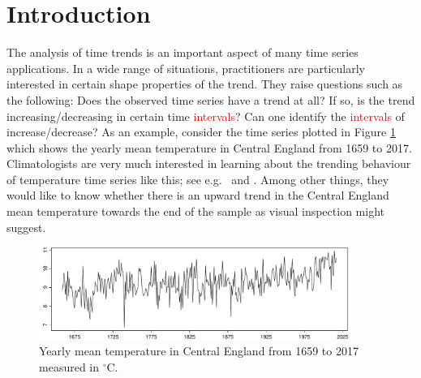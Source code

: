 
\section{Introduction}\label{sec-intro}


The analysis of time trends is an important aspect of many time series applications. In a wide range of situations, practitioners are particularly interested in certain shape properties of the trend. They raise questions such as the following: Does the observed time series have a trend at all? If so, is the trend increasing/decreasing in certain time \textcolor{red}{intervals}? Can one identify the \textcolor{red}{intervals} of increase/decrease? As an example, consider the time series plotted in Figure \ref{temp_data} which shows the yearly mean temperature in Central England from 1659 to 2017. Climatologists are very much interested in learning about the trending behaviour of temperature time series like this; see e.g.\ \cite{Benner1999} and \cite{Rahmstorf2017}. Among other things, they would like to know whether there is an upward trend in the Central England mean temperature towards the end of the sample as visual inspection might suggest.


\begin{figure}
\centering
\includegraphics[width=0.9\textwidth]{Plots/temp_data.pdf}
\vspace{0.15cm}

\caption{Yearly mean temperature in Central England from 1659 to 2017 measured in $^\circ$C.}\label{temp_data}
\end{figure}


